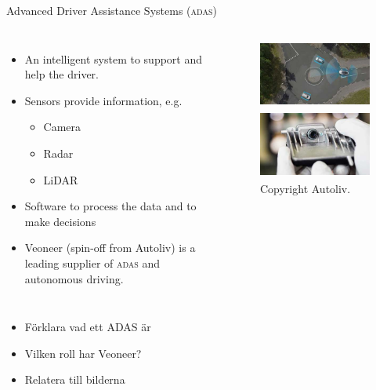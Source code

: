 \documentclass{beamer}
\newcommand{\adas}{\textsc{adas}\xspace}
\newcommand{\eg}{e.g.\xspace}
\renewcommand{\aa}{\"a\xspace}
\renewcommand{\o}{\"o\xspace}
\begin{document}
\begin{frame}{Advanced Driver Assistance Systems (\adas)}
	\begin{columns}
	\begin{itemize}
		\item An intelligent system to support and help the driver.
		\item Sensors provide information, \eg
		\begin{itemize}
			\item Camera
			\item Radar
			\item LiDAR
		\end{itemize}
		\item Software to process the data and to make decisions
		\item Veoneer (spin-off from Autoliv) is a leading supplier of \adas and autonomous driving.
	\end{itemize}
		\begin{figure}
			\includegraphics[height=2.25cm]{fig/ALV_Radar-Detection}

			\vspace{0.5em}

			\includegraphics[height=2.25cm]{fig/ALV_Mono-Vision-Sensor}
			\caption{Copyright Autoliv.}
		\end{figure}
	\end{columns}

	\note
	{
		\begin{itemize}
			\item F\o{}rklara vad ett ADAS \aa{}r
			\item Vilken roll har Veoneer?
			\item Relatera till bilderna
		\end{itemize}
	}
\end{frame}
\end{document}
